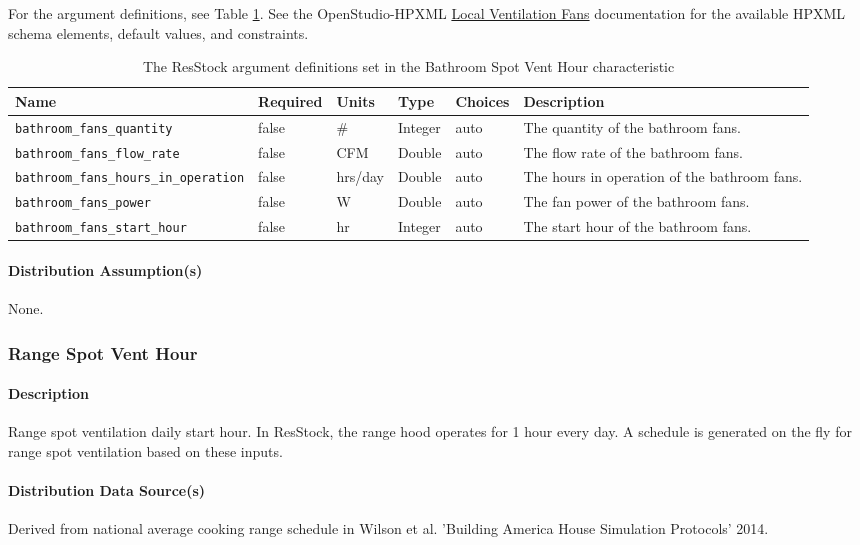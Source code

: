For the argument definitions, see Table \ref{table:hc_arg_def_bath_vent}. See the OpenStudio-HPXML \href{https://openstudio-hpxml.readthedocs.io/en/v1.8.1/workflow_inputs.html#hpxml-local-ventilation-fans}{Local Ventilation Fans} documentation for the available HPXML schema elements, default values, and constraints.

\begin{longtable}[]{|p{3.5cm}|p{1.5cm}|p{1.3cm}|p{1.1cm}|p{}|p{3.3cm}|} \caption{The ResStock argument definitions set in the Bathroom Spot Vent Hour characteristic} \label{table:hc_arg_def_bath_vent}\\
\toprule\noalign{}
Name & Required & Units & Type & Choices & Description \\
\midrule\noalign{}
\endhead
\bottomrule\noalign{}
\endlastfoot
\texttt{bathroom\_fans\_quantity} & false & \# & Integer & auto & The
quantity of the bathroom fans.  \\
\hline
\texttt{bathroom\_fans\_flow\_rate} & false & CFM & Double & auto & The
flow rate of the bathroom fans.  \\
\hline
\texttt{bathroom\_fans\_hours\_in\_operation} & false & hrs/day & Double
& auto & The hours in operation of the bathroom fans.  \\
\hline
\texttt{bathroom\_fans\_power} & false & W & Double & auto & The fan
power of the bathroom fans. \\
\hline
\texttt{bathroom\_fans\_start\_hour} & false & hr & Integer & auto & The
start hour of the bathroom fans.  \\
\end{longtable}

\paragraph{Distribution Assumption(s)}
None.

\subsubsection{Range Spot Vent Hour} \label{range_spot_vent_hour}
\paragraph{Description}
Range spot ventilation daily start hour. In ResStock, the range hood operates for 1 hour every day. A schedule is generated on the fly for range spot ventilation based on these inputs.

\paragraph{Distribution Data Source(s)}
Derived from national average cooking range schedule in Wilson et al. 'Building America House Simulation Protocols' 2014.
